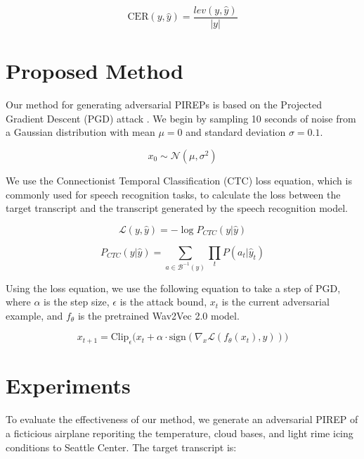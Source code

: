 \documentclass[11pt,a4paper]{article}
\begin{document}
\begin{equation}
  \text{CER}(y, \hat{y}) = \frac{lev(y, \hat{y})}{|y|}
\end{equation}

\section{Proposed Method}
\label{sec:method}

Our method for generating adversarial PIREPs is based on the Projected Gradient
Descent (PGD) attack \cite{madry2017towards}. We begin by sampling 10 seconds of
noise from a Gaussian distribution with mean $\mu = 0$ and standard deviation
$\sigma = 0.1$.

\begin{equation}
  x_0 \sim \mathcal{N}(\mu, \sigma^2)
  \label{eq:noise}
\end{equation}

We use the Connectionist Temporal Classification (CTC)
\cite{graves2006connectionist} loss equation, which is commonly used for speech
recognition tasks, to calculate the loss between the target transcript and the
transcript generated by the speech recognition model.

\begin{equation}
  \mathcal{L}(y, \hat{y}) = - \log P_{CTC}(y | \hat{y})
\end{equation}

\begin{equation}
  P_{CTC}(y | \hat{y}) = \sum_{a \in \mathcal{B}^{-1}(y)} \prod_{t} P(a_t | \hat{y}_t)
\end{equation}

Using the loss equation, we use the following equation to take a step of PGD,
where $\alpha$ is the step size, $\epsilon$ is the attack bound, $x_t$ is the
current adversarial example, and $f_\theta$ is the pretrained Wav2Vec 2.0 model.

\begin{equation}
  x_{t+1} = \text{Clip}_{\epsilon} \Big( x_t + \alpha \cdot \text{sign} \left( \nabla_{x} \mathcal{L}(f_\theta(x_t), y) \right) \Big)
\end{equation}

\section{Experiments}

To evaluate the effectiveness of our method, we generate an adversarial PIREP
of a ficticious airplane reporiting the temperature, cloud bases, and light rime
icing conditions to Seattle Center. The target transcript is:
\end{document}
